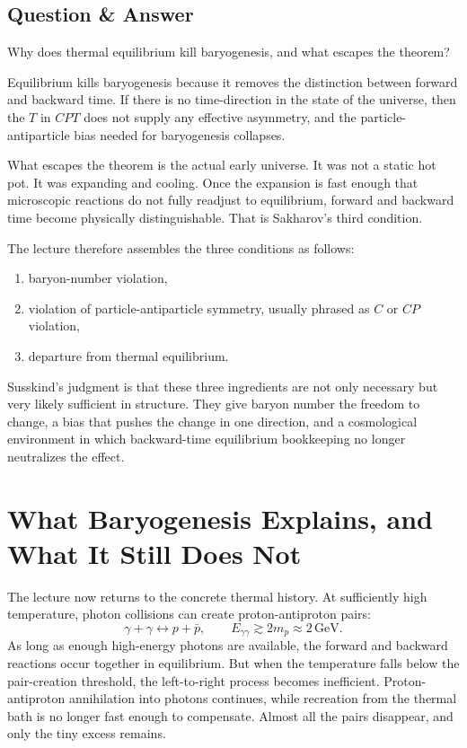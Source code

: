 \subsection{Question \& Answer}

Why does thermal equilibrium kill baryogenesis, and what escapes the theorem?

Equilibrium kills baryogenesis because it removes the distinction between forward and backward time. If there is no time-direction in the state of the universe, then the \(T\) in \(CPT\) does not supply any effective asymmetry, and the particle-antiparticle bias needed for baryogenesis collapses.

What escapes the theorem is the actual early universe. It was not a static hot pot. It was expanding and cooling. Once the expansion is fast enough that microscopic reactions do not fully readjust to equilibrium, forward and backward time become physically distinguishable. That is Sakharov's third condition.

The lecture therefore assembles the three conditions as follows:
\begin{enumerate}
\item baryon-number violation,
\item violation of particle-antiparticle symmetry, usually phrased as \(C\) or \(CP\) violation,
\item departure from thermal equilibrium.
\end{enumerate}
Susskind's judgment is that these three ingredients are not only necessary but very likely sufficient in structure. They give baryon number the freedom to change, a bias that pushes the change in one direction, and a cosmological environment in which backward-time equilibrium bookkeeping no longer neutralizes the effect.

\section{What Baryogenesis Explains, and What It Still Does Not}

The lecture now returns to the concrete thermal history. At sufficiently high temperature, photon collisions can create proton-antiproton pairs:
\begin{equation}
\gamma+\gamma \leftrightarrow p+\bar p,
\qquad
E_{\gamma\gamma}\gtrsim 2m_p \approx 2\,\mathrm{GeV}.
\end{equation}
As long as enough high-energy photons are available, the forward and backward reactions occur together in equilibrium. But when the temperature falls below the pair-creation threshold, the left-to-right process becomes inefficient. Proton-antiproton annihilation into photons continues, while recreation from the thermal bath is no longer fast enough to compensate. Almost all the pairs disappear, and only the tiny excess remains.

